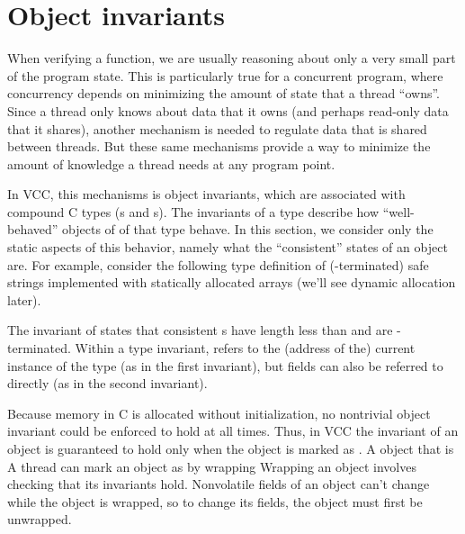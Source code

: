 \section{Object invariants}
\label{sect:invariants}


When verifying a function, we are usually reasoning about only a very
small part of the program state. This is particularly true for a
concurrent program, where concurrency depends on minimizing the amount
of state that a thread ``owns''. Since a thread only knows about data
that it owns (and perhaps read-only data that it shares), another
mechanism is needed to regulate data that is shared between
threads. But these same mechanisms provide a way to minimize the
amount of knowledge a thread needs at any program point.

In VCC, this mechanisms is object invariants, which are associated
with compound C types (s and s). The invariants
of a type describe how ``well-behaved'' objects of of that type
behave. In this section, we consider only the static aspects of this
behavior, namely what the ``consistent'' states of an object are. For
example, consider the following type definition of (-terminated)
safe strings implemented with statically allocated arrays (we'll see
dynamic allocation later).


\noindent
The invariant of  states that consistent
s have length less than  and are
-terminated.  Within a type invariant, \vcc{\this} refers to
the (address of the) current instance of the type (as in the first
invariant), but fields can also be referred to directly (as in the
second invariant). 

Because memory in C is allocated without initialization, no nontrivial
object invariant could be enforced to hold at all times. Thus, in VCC
the invariant of an object  is guaranteed to hold only when the
object is marked as \vcc{\consistent}. A \vcc{\consistent} object that
is 
A thread can mark an object as
\vcc{\consistent} by wrapping
Wrapping an object involves checking that
its invariants hold. Nonvolatile fields of an object can't change
while the object is wrapped, so to change its fields, the object must
first be unwrapped. 

